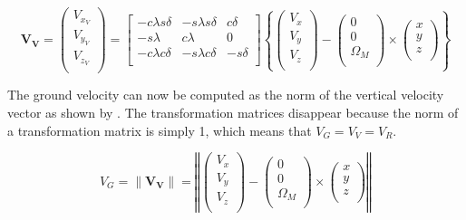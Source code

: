  \begin{equation} \label{eq:VItoVV}
\mathbf{V_{V}} =  
 \begin{pmatrix}
V_{x_{V}}\\
V_{y_{V}}\\
V_{z_{V}}\\
\end{pmatrix}
=
\left[
\begin{matrix}
-c\lambda s\delta & -s\lambda s\delta & c\delta\\
-s\lambda & c\lambda & 0\\
-c\lambda c\delta & -s\lambda c\delta & -s\delta\\
\end{matrix}
\right]
\left\lbrace
\begin{pmatrix}
V_{x}\\
V_{y}\\
V_{z}\\
\end{pmatrix}
-
\begin{pmatrix}
0 \\
0 \\
\Omega_{M} \\
\end{pmatrix}
\times
\begin{pmatrix}
x \\
y \\
z \\
\end{pmatrix}
\right\rbrace
 \end{equation}
 
The ground velocity can now be computed as the norm of the vertical velocity vector as shown by . The transformation matrices disappear because the norm of a transformation matrix is simply 1, which means that $V_{G}=V_{V}=V_{R}$.

\begin{equation} \label{eq:VG}
V_{G} = \| \mathbf{V_{V}} \| = 
\left\Vert
\begin{pmatrix}
V_{x}\\
V_{y}\\
V_{z}\\
\end{pmatrix}
-
\begin{pmatrix}
0 \\
0 \\
\Omega_{M} \\
\end{pmatrix}
\times
\begin{pmatrix}
x \\
y \\
z \\
\end{pmatrix}
\right\Vert 
\end{equation}

